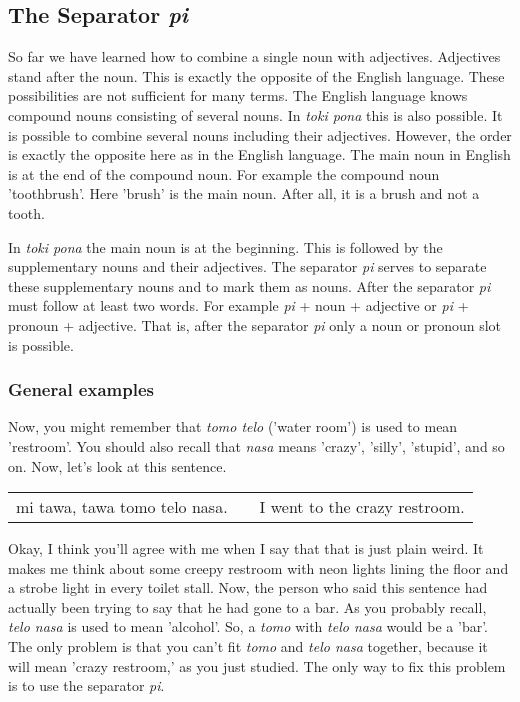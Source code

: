 \subsection*{The Separator \textit{pi}}
So far we have learned how to combine a single noun with adjectives.
Adjectives stand after the noun.
This is exactly the opposite of the English language.
These possibilities are not sufficient for many terms.
The English language knows compound nouns consisting of several nouns.
In \textit{toki pona} this is also possible.
It is possible to combine several nouns including their adjectives.
However, the order is exactly the opposite here as in the English language.
The main noun in English is at the end of the compound noun.
For example the compound noun 'toothbrush'. Here 'brush' is the main noun.
After all, it is a brush and not a tooth.

In \textit{toki pona} the main noun is at the beginning.
This is followed by the supplementary nouns and their adjectives.
The separator \textit{pi} serves to separate these supplementary nouns and to mark them as nouns.
After the separator \textit{pi} must follow at least two words.
For example \textit{pi} + noun + adjective or \textit{pi} + pronoun + adjective.
That is, after the separator \textit{pi} only a noun or pronoun slot is possible.

\subsubsection*{General examples}
Now, you might remember that \textit{tomo telo} ('water room') is used to mean 'restroom'.
You should also recall that \textit{nasa} means 'crazy', 'silly', 'stupid', and so on.
Now, let's look at this sentence.

\begin{supertabular}{p{5,5cm}|ll}
    mi tawa, tawa tomo telo nasa. &  & I went to the crazy restroom. \\
\end{supertabular}

Okay, I think you'll agree with me when I say that that is just plain weird.
It makes me think about some creepy restroom with neon lights lining the floor and a strobe light in every toilet stall.
Now, the person who said this sentence had actually been trying to say that he had gone to a bar.
As you probably recall, \textit{telo nasa} is used to mean 'alcohol'.
So, a \textit{tomo} with \textit{telo nasa} would be a 'bar'.
The only problem is that you can't fit \textit{tomo} and \textit{telo nasa} together, because it will mean 'crazy restroom,' as you just studied.
The only way to fix this problem is to use the separator \textit{pi}.

